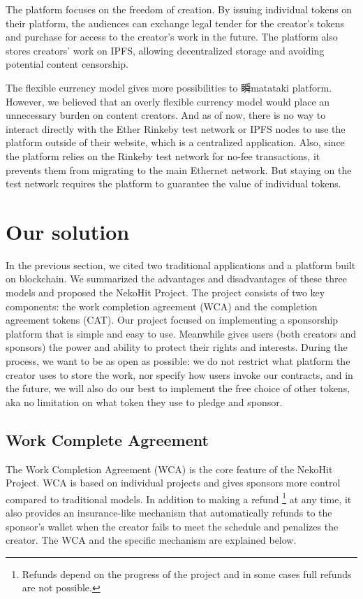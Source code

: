 \documentclass[12pt,a4paper]{article}
\begin{document}
    The platform focuses on the freedom of creation.
    By issuing individual tokens on their platform, the audiences can exchange
    legal tender for the creator's tokens and purchase for access to the
    creator's work in the future.
    The platform also stores creators' work on IPFS\cite{ipfs}, allowing
    decentralized storage and avoiding potential content censorship.

    The flexible currency model gives more possibilities to 瞬matataki platform.
    However, we believed that an overly flexible currency model would place an
    unnecessary burden on content creators.
    And as of now, there is no way to interact directly with the Ether Rinkeby
    test network or IPFS nodes to use the platform outside of their website,
    which is a centralized application.
    Also, since the platform relies on the Rinkeby test network for no-fee
    transactions, it prevents them from migrating to the main Ethernet network.
    But staying on the test network requires the platform to guarantee the value
    of individual tokens.


    \section{Our solution}\label{sec:solution}

    In the previous section, we cited two traditional applications and a platform
    built on blockchain.
    We summarized the advantages and disadvantages of these three models and
    proposed the NekoHit Project.
    The project consists of two key components: the work completion agreement
    (WCA) and the completion agreement tokens (CAT).
    Our project focused on implementing a sponsorship platform that is simple and
    easy to use.
    Meanwhile gives users (both creators and sponsors) the power and ability to
    protect their rights and interests.
    During the process, we want to be as open as possible: we do not restrict
    what platform the creator uses to store the work, nor specify how users invoke
    our contracts, and in the future, we will also do our best to implement the
    free choice of other tokens, aka no limitation on what token they use to
    pledge and sponsor.

    \subsection{Work Complete Agreement}\label{subsec:wca}

    The Work Completion Agreement (WCA) is the core feature of the NekoHit Project.
    WCA is based on individual projects and gives sponsors more control compared
    to traditional models.
    In addition to making a refund \footnote{
        Refunds depend on the progress of the project and
        in some cases full refunds are not possible.
    } at any time, it also provides an insurance-like
    mechanism that automatically refunds to the sponsor's wallet when the creator
    fails to meet the schedule and penalizes the creator.
    The WCA and the specific mechanism are explained below.
\end{document}
